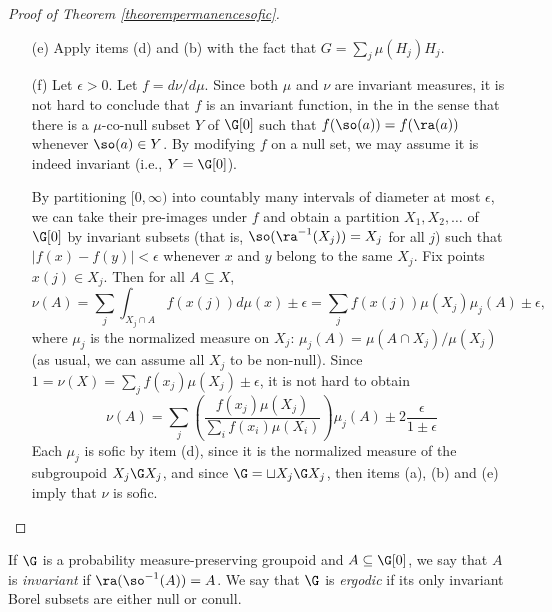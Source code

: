 \begin{proof}[Proof of Theorem \ref{theorempermanencesofic}]
\begin{enumerate}
Consider then $\H_i=\Theta_i(\H[0])\G_i\Theta_i(\H[0])$, which is a subgroupoid of $\G_i$, and endow it with the subgroupoid measure. The distance in $\MEAS(\H_i)$ is the same as the distance in $\MEAS(\G_i,\mu_i)$, up to a multiplicative factor of
\[\mu_i(\H_i)^{-1}=\tr_{\mu_i}(\Theta_i(\H[0]))^{-1}\]
which converges to $\tr_{\mu}(\H[0])^{-1}$ along $\mathcal{U}$. This is the same multiplicative factor which relates the metrics in $\MEAS(\H,\mu_{\H})$ and $\MEAS(\G,\mu_{\G})$, so we obtain a sofic embedding
\[\MEAS(\H,\mu_{\H})\to\prod_{\mathcal{U}}\MEAS(\H_i),\qquad A\mapsto (\Theta_i(A))_{\mathcal{U}}\]
\item[(e)] Apply items (d) and (b) with the fact that $G=\sum_j \mu(H_j)H_j$.
\item[(f)] Let $\epsilon>0$. Let $f=d\nu/d\mu$. Since both $\mu$ and $\nu$ are invariant measures, it is not hard to conclude that $f$ is an invariant function, in the in the sense that there is a $\mu$-co-null subset $Y$ of $\G[0]$ such that $f(\so(a))=f(\ra(a))$ whenever $\so(a)\in Y$. By modifying $f$ on a null set, we may assume it is indeed invariant (i.e., $Y=\G[0]$).

By partitioning $[0,\infty)$ into countably many intervals of diameter at most $\epsilon$, we can take their pre-images under $f$ and obtain a partition $X_1,X_2,\ldots$ of $\G[0]$ by invariant subsets (that is, $\so(\ra^{-1}(X_j))=X_j$ for all $j$) such that $|f(x)-f(y)|<\epsilon$ whenever $x$ and $y$ belong to the same $X_j$. Fix points $x(j)\in X_j$. Then for all $A\subseteq X$,
\[\nu(A)=\sum_j\int_{X_j\cap A}f(x(j))d\mu(x)\pm\epsilon=\sum_jf(x(j))\mu(X_j)\mu_j(A)\pm\epsilon,\]
where $\mu_j$ is the normalized measure on $X_j$: $\mu_j(A)=\mu(A\cap X_j)/\mu(X_j)$ (as usual, we can assume all $X_j$ to be non-null). Since $1=\nu(X)=\sum_j f(x_j)\mu(X_j)\pm\epsilon$, it is not hard to obtain
\[\nu(A)=\sum_j\left(\frac{f(x_j)\mu(X_j)}{\sum_i f(x_i)\mu(X_i)}\right)\mu_j(A)\pm2\frac{\epsilon}{1\pm\epsilon}\]
Each $\mu_j$ is sofic by item (d), since it is the normalized measure of the subgroupoid $X_j\G X_j$, and since $\G=\sqcup X_j\G X_j$, then items (a), (b) and (e) imply that $\nu$ is sofic.\qedhere
\end{enumerate}
\end{proof}

\begin{definition}\label{definitionergodic}
If $\G$ is a probability measure-preserving groupoid and $A\subseteq\G[0]$, we say that $A$ is \emph{invariant} if $\ra(\so^{-1}(A))=A$. We say that $\G$ is \emph{ergodic} if its only invariant Borel subsets are either null or conull.
\end{definition}

